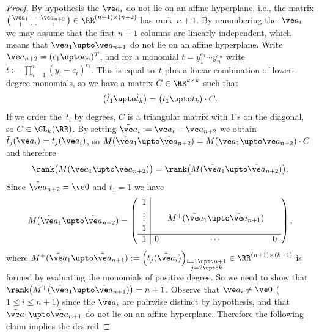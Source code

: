 \documentclass[reqno]{amsart}
\begin{document}
\begin{proof}
  By hypothesis the $\ve a_i$ do not lie on an affine hyperplane,
  i.e., the matrix
  $\left(\begin{smallmatrix} \ve a_1 & \cdots & \ve a_{n+2} \\ 1 &
      \cdots & 1\end{smallmatrix}\right) \in \RR^{(n+1) \times (n+2)}$
  has rank~$n+1$. By renumbering the~$\ve a_i$ we may assume that the
  first $n+1$ columns are linearly independent, which means that
  $\ve a_1 \upto \ve a_{n+1}$ do not lie on an affine
  hyperplane. Write $\ve a_{n+2} = (c_1 \upto c_n)^T$, and for a
  monomial $t = y_1^{e_1} \cdots y_n^{e_n}$ write
  $\tilde t := \prod_{i=1}^n (y_i - c_i)^{e_i}$. This is equal to~$t$
  plus a linear combination of lower-degree monomials, so we have a
  matrix $C \in \RR^{k \times k}$ such that
  \[
    \bigl(\tilde t_1 \upto \tilde t_k\bigr) = \bigl(t_1 \upto t_k)
    \cdot C.
  \]
  If we order the~$t_i$ by degrees, $C$ is a triangular matrix with
  $1$'s on the diagonal, so $C \in \GL_k(\RR)$. By setting
  $\tilde {\ve a}_i := \ve a_i - \ve a_{n+2}$ we obtain
  $\tilde t_j(\ve a_i) = t_j(\tilde{\ve a}_i)$, so
  $M(\tilde{\ve a}_1 \upto \tilde{\ve a}_{n+2}) = M(\ve a_1 \upto \ve
  a_{n+2}) \cdot C$ and therefore
  \[
    \rank\bigl(M(\ve a_1 \upto \ve a_{n+2})\bigr) =
    \rank\bigl(M(\tilde{\ve a}_1 \upto \tilde{\ve a}_{n+2})\bigr).
  \]
  Since $\tilde{\ve a}_{n+2} = \ve 0$ and $t_1 = 1$ we have
  \[
    M(\tilde{\ve a}_1 \upto \tilde{\ve a}_{n+2}) = \left(
      \begin{array}{c|ccc}
        1 & & & \\
        \vdots & & M^+(\tilde{\ve a}_1 \upto \tilde{\ve a}_{n+1}) & \\
        1 & & & \\
        \hline
        1 & 0 & \cdots & 0
      \end{array}
    \right),
  \]
  where
  $M^+(\tilde{\ve a}_1 \upto \tilde{\ve a}_{n+1}) :=
  \Bigl(t_j(\tilde{\ve a}_i)\Bigr)_{\substack{i = 1 \upto n+1 \\ j = 2
      \upto k}} \in \RR^{(n+1) \times (k-1)}$ is formed by evaluating
  the monomials of positive degree. So we need to show that
  $\rank\bigl(M^+(\tilde{\ve a}_1 \upto \tilde{\ve a}_{n+1})\bigr) =
  n+1$. Observe that $\tilde{\ve a}_i \ne \ve 0$ ($1 \le i \le n+1$)
  since the $\ve a_i$ are pairwise distinct by hypothesis, and that
  $\tilde{\ve a}_1 \upto \tilde{\ve a}_{n+1}$ do not lie on an affine
  hyperplane. Therefore the following claim implies the desired

\end{proof}
\end{document}

